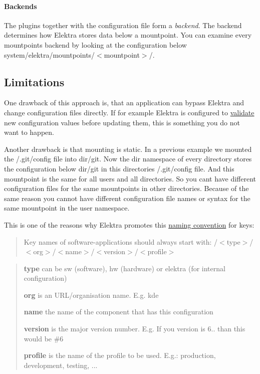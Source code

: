 \paragraph*{Backends}

The plugins together with the configuration file form a {\itshape backend}. The backend determines how Elektra stores data below a mountpoint. You can examine every mountpoints backend by looking at the configuration below {\ttfamily system/elektra/mountpoints/$<$mountpoint$>$/}.

\subsection*{Limitations}

One drawback of this approach is, that an application can bypass Elektra and change configuration files directly. If for example Elektra is configured to \hyperlink{md_doc_tutorials_validation_doc_tutorials_validation_md}{validate} new configuration values before updating them, this is something you do not want to happen.

Another drawback is that mounting is static. In a previous example we mounted the {\ttfamily /.git/config} file into {\ttfamily dir/git}. Now the {\ttfamily dir} namespace of every directory stores the configuration below {\ttfamily dir/git} in this directories {\ttfamily /.git/config} file. And this mountpoint is the same for all users and all directories. So you can\textquotesingle{}t have different configuration files for the same mountpoints in other directories. Because of the same reason you cannot have different configuration file names or syntax for the same mountpoint in the {\ttfamily user} namespace.

This is one of the reasons why Elektra promotes this \hyperlink{md_doc_help_elektra-key-names_doc_help_elektra-key-names_md}{naming convention} for keys\+:

\begin{quote}
Key names of software-\/applications should always start with\+: {\ttfamily /$<$type$>$/$<$org$>$/$<$name$>$/$<$version$>$/$<$profile$>$} \end{quote}


\begin{quote}

\begin{DoxyItemize}
\item {\bfseries type} can be {\ttfamily sw} (software), {\ttfamily hw} (hardware) or {\ttfamily elektra} (for internal configuration)
\item {\bfseries org} is an U\+R\+L/organisation name. E.\+g. {\ttfamily kde}
\item {\bfseries name} the name of the component that has this configuration
\item {\bfseries version} is the major version number. E.\+g. If you version is 6.. than this would be {\ttfamily \#6}
\item {\bfseries profile} is the name of the profile to be used. E.\+g.\+: {\ttfamily production}, {\ttfamily development}, {\ttfamily testing}, ... 
\end{DoxyItemize}\end{quote}


